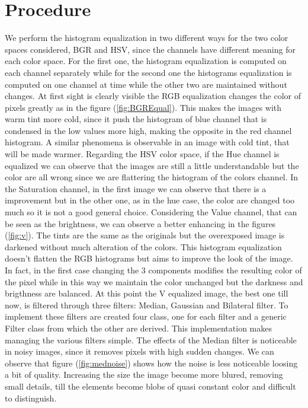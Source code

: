 \documentclass[11pt,a4paper]{article}
\newcommand{\cc}{\fontfamily{txtt}\selectfont}
\begin{document}
\section{Procedure}
We perform the histogram equalization in two different ways for the two color spaces considered, BGR and HSV, since the channels have different meaning for each color space.
For the first one, the histogram equalization is computed on each channel separately while for the second one the histograms equalization is computed on one channel at time while the other two are maintained without changes.
At first sight is clearly visible the RGB equalization changes the color of pixels greatly as in the figure (\ref{fig:BGREqual}).
This makes the images with warm tint more cold, since it push the histogram of blue channel that is condensed in the low values more high, making the opposite in the red channel histogram.
A similar phenomena is observable in an image with cold tint, that will be made warmer.
Regarding the HSV color space, if the Hue channel is equalized we can observe that the images are still a little understandable but the color are all wrong since we are flattering the histogram of the colors channel.
In the Saturation channel, in the first image we can observe that there is a improvement but in the other one, as in the hue case, the color are changed too much so it is not a good general choice.
Considering the Value channel, that can be seen as the brightness, we can observe a better enhancing in the figures (\ref{fig:v}). The tints are the same as the originals but the overexposed image is darkened without much alteration of the colors. This histogram equalization doesn't flatten the RGB histograms but aims to improve the look of the image. In fact, in the first case changing the 3 components modifies the resulting color of the pixel while in this way we maintain the color unchanged but the darkness and brigthness are balanced.\newline
At this point the V equalized image, the best one till now, is filtered through three filters: Median, Gaussian and Bilateral filter.
To implement these filters are created four class, one for each filter and a generic {\cc Filter} class from which the other are derived.
This implementation makes managing the various filters simple.
The effects of the Median filter is noticeable in noisy images, since it removes pixels with high sudden changes.
We can observe that figure (\ref{fig:mednoise}) shows how the noise is less noticeable loosing a bit of quality.
Increasing the size the image become more blured, removing small details, till the elements become blobs of quasi constant color and difficult to distinguish.\newline
\end{document}
